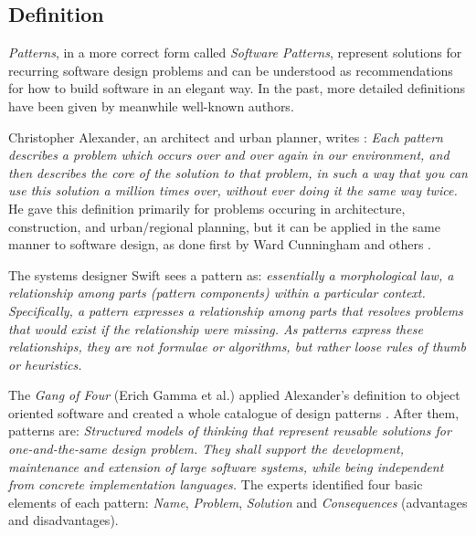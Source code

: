 %
%
%
%
%
%
%

\subsection{Definition}
\label{definition_heading}

\emph{Patterns}, in a more correct form called \emph{Software Patterns}, represent
solutions for recurring software design problems and can be understood as
recommendations for how to build software in an elegant way. In the past, more
detailed definitions have been given by meanwhile well-known authors.

Christopher Alexander, an architect and urban planner, writes \cite{alexander}:
\textit{Each pattern describes a problem which occurs over and over again in
our environment, and then describes the core of the solution to that problem,
in such a way that you can use this solution a million times over, without ever
doing it the same way twice.} He gave this definition primarily for problems
occuring in architecture, construction, and urban/regional planning, but it can
be applied in the same manner to software design, as done first by Ward
Cunningham and others \cite{portland}.

The systems designer Swift \cite{designmatrix} sees a pattern as:
\textit{essentially a morphological law, a relationship among parts (pattern
components) within a particular context. Specifically, a pattern expresses a
relationship among parts that resolves problems that would exist if the
relationship were missing. As patterns express these relationships, they are
not formulae or algorithms, but rather loose rules of thumb or heuristics.}

The \emph{Gang of Four} (Erich Gamma et al.) applied Alexander's definition to
object oriented software and created a whole catalogue of design patterns
\cite{gamma1995}. After them, patterns are: \textit{Structured models of
thinking that represent reusable solutions for one-and-the-same design problem.
They shall support the development, maintenance and extension of large software
systems, while being independent from concrete implementation languages.} The
experts identified four basic elements of each pattern: \emph{Name},
\emph{Problem}, \emph{Solution} and \emph{Consequences} (advantages and
disadvantages).

